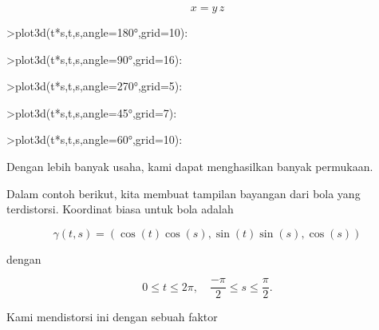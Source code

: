 \documentclass{article}
\begin{document}
\begin{eulernotebook}
\begin{eulercomment}
\end{eulercomment}
\begin{eulerformula}
\[
x = y \, z
\]
\end{eulerformula}
\begin{eulerprompt}
>plot3d(t*s,t,s,angle=180°,grid=10):
\end{eulerprompt}
\begin{eulerprompt}
>plot3d(t*s,t,s,angle=90°,grid=16):
\end{eulerprompt}
\begin{eulerprompt}
>plot3d(t*s,t,s,angle=270°,grid=5):
\end{eulerprompt}
\begin{eulerprompt}
>plot3d(t*s,t,s,angle=45°,grid=7):
\end{eulerprompt}
\begin{eulerprompt}
>plot3d(t*s,t,s,angle=60°,grid=10):
\end{eulerprompt}
\begin{eulercomment}
Dengan lebih banyak usaha, kami dapat menghasilkan banyak permukaan.

Dalam contoh berikut, kita membuat tampilan bayangan dari bola yang
terdistorsi. Koordinat biasa untuk bola adalah

\end{eulercomment}
\begin{eulerformula}
\[
\gamma(t,s) = (\cos(t)\cos(s),\sin(t)\sin(s),\cos(s))
\]
\end{eulerformula}
\begin{eulercomment}
dengan

\end{eulercomment}
\begin{eulerformula}
\[
0 \le t \le 2\pi, \quad \frac{-\pi}{2} \le s \le \frac{\pi}{2}.
\]
\end{eulerformula}
\begin{eulercomment}
Kami mendistorsi ini dengan sebuah faktor


\end{eulercomment}
\end{eulernotebook}
\end{document}
